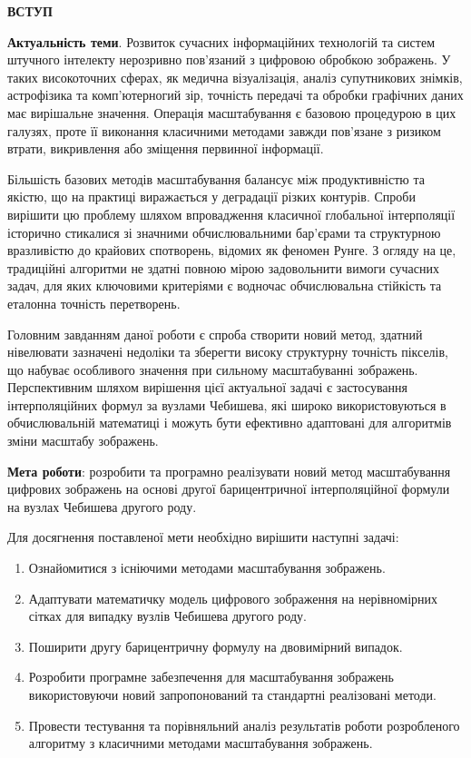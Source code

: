 \begin{center}
	\textbf{ВСТУП}
\end{center}
\textbf{Актуальність теми}. Розвиток сучасних інформаційних технологій та систем штучного інтелекту нерозривно пов'язаний з цифровою обробкою зображень. У таких високоточних сферах, як медична візуалізація, аналіз супутникових знімків, астрофізика та комп'ютерногий зір, точність передачі та обробки графічних даних має вирішальне значення. Операція масштабування є базовою процедурою в цих галузях, проте її виконання класичними методами завжди пов'язане з ризиком втрати, викривлення або зміщення первинної інформації.

Більшість базових методів масштабування балансує між продуктивністю та якістю, що на практиці виражається у деградації різких контурів. Спроби вирішити цю проблему шляхом впровадження класичної глобальної інтерполяції історично стикалися зі значними обчислювальними бар'єрами та структурною вразливістю до крайових спотворень, відомих як феномен Рунге. З огляду на це, традиційні алгоритми не здатні повною мірою задовольнити вимоги сучасних задач, для яких ключовими критеріями є водночас обчислювальна стійкість та еталонна точність перетворень.

Головним завданням даної роботи є спроба створити новий метод, здатний нівелювати зазначені недоліки та зберегти високу структурну точність пікселів, що набуває особливого значення при сильному масштабуванні зображень. Перспективним шляхом вирішення цієї актуальної задачі є застосування інтерполяційних формул за вузлами Чебишева, які широко використовуються в обчислювальній математиці і можуть бути ефективно адаптовані для алгоритмів зміни масштабу зображень.

\textbf{Мета роботи}: розробити та програмно реалізувати новий метод масштабування цифрових зображень на основі другої барицентричної інтерполяційної формули на вузлах Чебишева другого роду.

Для досягнення поставленої мети необхідно вирішити наступні задачі:

\begin{enumerate}
	\item Ознайомитися з існіючими методами масштабування зображень.
	\item  Адаптувати математичку модель цифрового зображення на нерівномірних сітках для випадку вузлів Чебишева другого роду.
	\item Поширити другу барицентричну формулу на двовимірний випадок.
	\item Розробити програмне забезпечення для масштабування зображень використовуючи новий запропонований та стандартні реалізовані методи.
	\item Провести тестування та порівняльний аналіз результатів роботи розробленого алгоритму з класичними методами масштабування зображень.
\end{enumerate}

